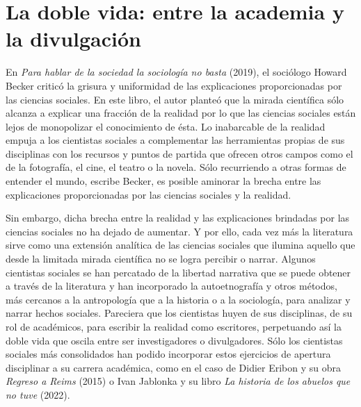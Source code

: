 \documentclass[
  spanish,
  11pt,
  a4paper,
]{scrbook}
\begin{document}
\section*{La doble vida: entre la academia y la
divulgación}\label{la-doble-vida-entre-la-academia-y-la-divulgaciuxf3n}


En \emph{Para hablar de la sociedad la sociología no basta} (2019), el
sociólogo Howard Becker criticó la grisura y uniformidad de las
explicaciones proporcionadas por las ciencias sociales. En este libro,
el autor planteó que la mirada científica sólo alcanza a explicar una
fracción de la realidad por lo que las ciencias sociales están lejos de
monopolizar el conocimiento de ésta. Lo inabarcable de la realidad
empuja a los cientistas sociales a complementar las herramientas propias
de sus disciplinas con los recursos y puntos de partida que ofrecen
otros campos como el de la fotografía, el cine, el teatro o la novela.
Sólo recurriendo a otras formas de entender el mundo, escribe Becker, es
posible aminorar la brecha entre las explicaciones proporcionadas por
las ciencias sociales y la realidad.

Sin embargo, dicha brecha entre la realidad y las explicaciones
brindadas por las ciencias sociales no ha dejado de aumentar. Y por
ello, cada vez más la literatura sirve como una extensión analítica de
las ciencias sociales que ilumina aquello que desde la limitada mirada
científica no se logra percibir o narrar. Algunos cientistas sociales se
han percatado de la libertad narrativa que se puede obtener a través de
la literatura y han incorporado la autoetnografía y otros métodos, más
cercanos a la antropología que a la historia o a la sociología, para
analizar y narrar hechos sociales. Pareciera que los cientistas huyen de
sus disciplinas, de su rol de académicos, para escribir la realidad como
escritores, perpetuando así la doble vida que oscila entre ser
investigadores o divulgadores. Sólo los cientistas sociales más
consolidados han podido incorporar estos ejercicios de apertura
disciplinar a su carrera académica, como en el caso de Didier Eribon y
su obra \emph{Regreso a Reims} (2015) o Ivan Jablonka y su libro
\emph{La historia de los abuelos que no tuve} (2022).
\end{document}
